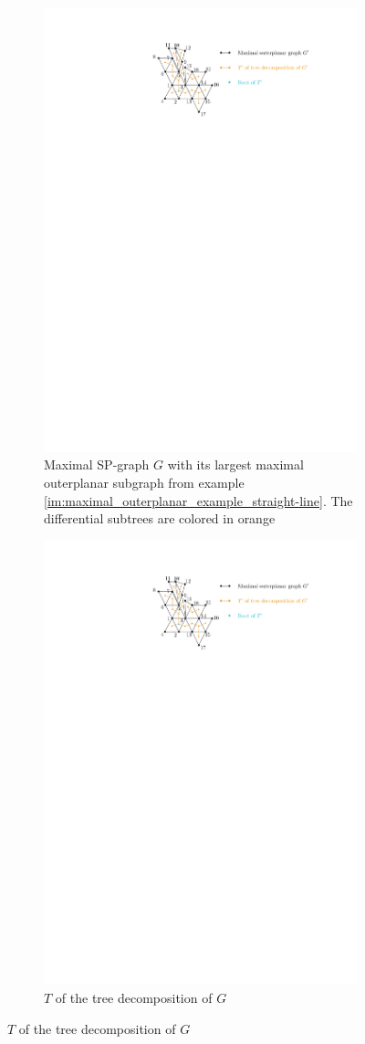 \begin{figure}[H]
	\centering
	\begin{subfigure}{\textwidth}
		\centering
		\includegraphics[page=10,width=0.8\linewidth]{graphics/maximal_outerplanar_example_drawings.pdf}
			\caption{Maximal SP-graph $G$ with its largest maximal outerplanar subgraph from example \ref{im:maximal_outerplanar_example_straight-line}. The differential subtrees are colored in orange}
	\end{subfigure}
	\begin{subfigure}{\textwidth}
	\centering
	\includegraphics[page=11,width=0.5\linewidth]{graphics/maximal_outerplanar_example_drawings.pdf}
		\caption{$T$ of the tree decomposition of $G$}
\end{subfigure}

\end{figure}


